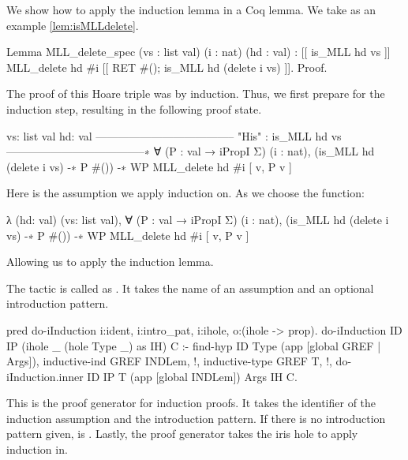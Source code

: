\documentclass[thesis.tex]{subfiles}
\begin{document}
{\begin{example}{}{}
  We show how to apply the induction lemma in a Coq lemma.
  We take as an example \cref{lem:isMLLdelete}.
  \begin{coqcode}
    Lemma MLL_delete_spec (vs : list val) 
                          (i : nat) (hd : val) :
      [[{ is_MLL hd vs }]]
        MLL_delete hd #i
      [[{ RET #(); is_MLL hd (delete i vs) }]].
    Proof.
  \end{coqcode}
  The proof of this Hoare triple was by induction. Thus, we first prepare for the induction step, resulting in the following proof state.
  \begin{coqcode}
    vs: list val
    hd: val
    --------------------------------------
    "His" : is_MLL hd vs
    --------------------------------------∗
    ∀ (P : val → iPropI Σ) (i : nat),
      (is_MLL hd (delete i vs) -∗ P #()) -∗ 
      WP MLL_delete hd #i [{ v, P v }]
  \end{coqcode}
  Here  is the assumption we apply induction on. As  we choose the function:
  \begin{coqcode}
    λ (hd: val) (vs: list val), 
      ∀ (P : val → iPropI Σ) (i : nat),
        (is_MLL hd (delete i vs) -∗ P #()) -∗ 
        WP MLL_delete hd #i [{ v, P v }]
  \end{coqcode}
  Allowing us to apply the induction lemma.
\end{example}

The  tactic is called as . It takes the name of an assumption and an optional introduction pattern.
\begin{elpicode}
  pred do-iInduction i:ident, i:intro_pat, i:ihole, 
                     o:(ihole -> prop).
  do-iInduction ID IP (ihole _ (hole Type _) as IH) C :-
    find-hyp ID Type (app [global GREF | Args]),
    inductive-ind GREF INDLem, !,
    inductive-type GREF T, !,
    do-iInduction.inner ID IP T (app [global INDLem]) 
                        Args IH C.
\end{elpicode}
This is the proof generator for induction proofs. It takes the identifier of the induction assumption and the introduction pattern. If there is no introduction pattern given,  is . Lastly, the proof generator takes the iris hole to apply induction in.

}
\end{document}
